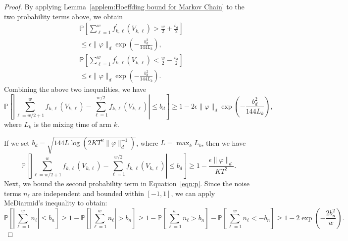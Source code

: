 \documentclass[twoside]{article}
\theoremstyle{plain}
\theoremstyle{definition}
\theoremstyle{remark}
\begin{document}
\begin{proof}
By applying Lemma~\ref{applem:Hoeffding bound for Markov Chain} to the two probability terms above, we obtain
\begin{subequations}
    \begin{align}
        &\mathbb{P}\left[\sum_{\ell = 1}^{w} f^{\prime}_{k,\ell}(V_{k,\ell}) 
        > \frac{w}{2} + \frac{b_d}{2} \right] \\
        &\leq \epsilon \lVert \varphi \rVert_{d} \exp\left(-\frac{b_d^2}{144 L_{k}}\right), \\
        &\mathbb{P}\left[\sum_{\ell = 1}^{w} f^{\prime}_{k,\ell}(V_{k,\ell}) 
        < \frac {w}{2} - \frac{b_d}{2} \right] \\
        &\leq \epsilon \lVert \varphi \rVert_{d} \exp\left(-\frac{b_d^2}{144 L_{k}}\right).
    \end{align}
\end{subequations}
Combining the above two inequalities, we have
\begin{equation}
    \mathbb{P}\left[\left\lvert 
    \sum_{\ell = w/2+1}^{w} f_{k,\ell}(V_{k,\ell}) 
    - \sum_{\ell = 1}^{w/2} f_{k,\ell}(V_{k,\ell})
    \right\rvert \leq b_d \right]
    \geq 1 - 2 \epsilon \lVert \varphi \rVert_{d} \exp\left(-\frac{b_d^2}{144 L_{k}}\right),
\end{equation}
where \( L_{k} \) is the mixing time of arm \( k \). 

If we set \( b_d = \sqrt{144 L \log\left(2KT^2\lVert \varphi \rVert_{d}^{-1}\right)} \), where \( L = \max_{k} L_{k} \), then we have
\begin{equation}
    \mathbb{P}\left[\left\lvert 
    \sum_{\ell = w/2+1}^{w} f_{k,\ell}(V_{k,\ell}) 
    - \sum_{\ell = 1}^{w/2} f_{k,\ell}(V_{k,\ell})
    \right\rvert \leq b_d \right]
    \geq 1 - \frac{\epsilon \lVert \varphi \rVert_{d}}{KT^2}.
\end{equation}
Next, we bound the second probability term in Equation~\ref{eqn:p}. Since the noise terms \( n_{\ell} \) are independent and bounded within \([-1,1]\), we can apply McDiarmid's inequality to obtain:
\begin{equation}
    \mathbb{P}\left[\left\lvert 
    \sum_{\ell = 1}^{w} n_{\ell} 
    \right\rvert \leq b_n \right]
    \geq 1 - \mathbb{P}\left[\left\lvert 
    \sum_{\ell = 1}^{w} n_{\ell} 
    \right\rvert > b_n \right]
    \geq 1 - \mathbb{P}\left[\sum_{\ell = 1}^{w} n_{\ell} > b_n \right] - \mathbb{P}\left[\sum_{\ell = 1}^{w} n_{\ell} < -b_n \right]
    \geq 1 - 2\exp\left(-\frac{2b_n^2}{w}\right).
\end{equation}


\end{proof}
\end{document}
